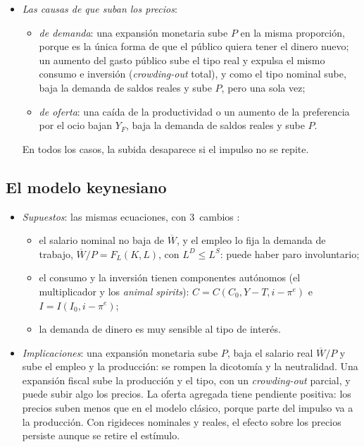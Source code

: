 \documentclass[11pt]{article}
\begin{document}
\begin{itemize}
\begin{itemize}
  \item el : con el tipo real fijado por el bloque real, la inflación esperada se traslada uno por uno al tipo nominal, $i=r+\pi^e$ .
  \end{itemize}
\item \emph{Las causas de que suban los precios}:
  \begin{itemize}
  \item \emph{de demanda}: una expansión monetaria sube $P$ en la misma proporción, porque es la única forma de que el público quiera tener el dinero nuevo; un aumento del gasto público sube el tipo real y expulsa el mismo consumo e inversión (\emph{crowding-out} total), y como el tipo nominal sube, baja la demanda de saldos reales y sube $P$, pero una sola vez;
  \item \emph{de oferta}: una caída de la productividad o un aumento de la preferencia por el ocio bajan $Y_F$, baja la demanda de saldos reales y sube $P$.
  \end{itemize}
  En todos los casos, la subida desaparece si el impulso no se repite.
\end{itemize}

\subsection{El modelo keynesiano}\label{anexo:keynesiano}

\begin{itemize}
\item \emph{Supuestos}: las mismas ecuaciones, con 3~cambios\nocite{Serletis2007Demand}  :
  \begin{itemize}
  \item el salario nominal no baja de $\overline W$, y el empleo lo fija la demanda de trabajo, $\overline W/P=F_L(K,L)$, con $L^D\leq L^S$: puede haber paro involuntario;
  \item el consumo y la inversión tienen componentes autónomos (el multiplicador y los \emph{animal spirits}): $C=C(C_0,Y-T,i-\pi^e)$ e $I=I(I_0,i-\pi^e)$;
  \item la demanda de dinero es muy sensible al tipo de interés.
  \end{itemize}
\item \emph{Implicaciones}: una expansión monetaria sube $P$, baja el salario real $\overline W/P$ y sube el empleo y la producción: se rompen la dicotomía y la neutralidad. Una expansión fiscal sube la producción y el tipo, con un \emph{crowding-out} parcial, y puede subir algo los precios. La oferta agregada tiene pendiente positiva: los precios suben menos que en el modelo clásico, porque parte del impulso va a la producción. Con rigideces nominales y reales, el efecto sobre los precios persiste aunque se retire el estímulo.
\end{itemize}
\end{document}
